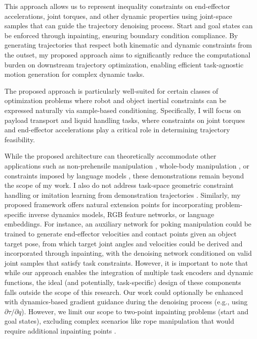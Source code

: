 This approach allows us to represent inequality constraints on end-effector accelerations, joint torques, and other dynamic properties using joint-space samples that can guide the trajectory denoising process. Start and goal states can be enforced through inpainting, ensuring boundary condition compliance.
By generating trajectories that respect both kinematic and dynamic constraints from the outset, my proposed approach aims to significantly reduce the computational burden on downstream trajectory optimization, enabling efficient task-agnostic motion generation for complex dynamic tasks.

The proposed approach is particularly well-suited for certain classes of optimization problems where robot and object inertial constraints can be expressed naturally via sample-based conditioning. Specifically, I will focus on payload transport and liquid handling tasks, where constraints on joint torques and end-effector accelerations play a critical role in determining trajectory feasibility.

While the proposed architecture can theoretically accommodate other applications such as non-prehensile manipulation \cite{pasricha2022pokerrt}, whole-body manipulation \cite{briscoe2024exploring}, or constraints imposed by language models \cite{ha2023scaling}, these demonstrations remain beyond the scope of my work. I also do not address task-space geometric constraint handling \cite{kingston2018sampling} or imitation learning from demonstration trajectories \cite{chi2023diffusion}.
Similarly, my proposed framework offers natural extension points for incorporating problem-specific inverse dynamics models, RGB feature networks, or language embeddings. For instance, an auxiliary network for poking manipulation could be trained to generate end-effector velocities and contact points given an object target pose, from which target joint angles and velocities could be derived and incorporated through inpainting, with the denoising network conditioned on valid joint samples that satisfy task constraints. However, it is important to note that while our approach enables the integration of multiple task encoders and dynamic functions, the ideal (and potentially, task-specific) design of these components falls outside the scope of this research.
Our work could optionally be enhanced with dynamics-based gradient guidance during the denoising process (e.g., using $\partial \tau / \partial q$). However, we limit our scope to two-point inpainting problems (start and goal states), excluding complex scenarios like rope manipulation that would require additional inpainting points \cite{zhang2021robots}.

